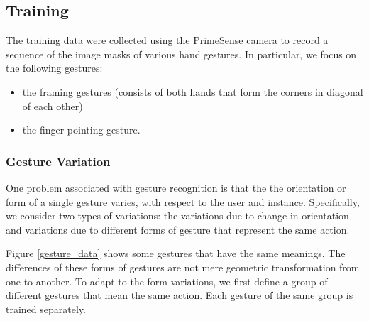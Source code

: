 \subsection{Training}
The training data were collected using the PrimeSense camera to record a
sequence of the image masks of various hand gestures. In particular, we focus
on the following gestures:
\begin{itemize}
    \item the framing gestures (consists of both hands that form the corners
          in diagonal of each other)
    \item the finger pointing gesture.
\end{itemize}

\subsubsection{Gesture Variation}
One problem associated with gesture recognition is that the the orientation
or form of a single gesture varies, with respect to the user and instance. 
Specifically, we consider two types of variations: the variations due to
change in orientation \cite{ren2011robust, uebersax2011real, li2009real} and
variations due to different forms of gesture that represent the same action. 

Figure \ref{gesture_data} shows some gestures that have the same meanings. The differences of these forms of gestures are not mere geometric transformation from one to another. To adapt to the form variations, we first define a group of different gestures that mean the same action. Each gesture of the same group is trained separately.

